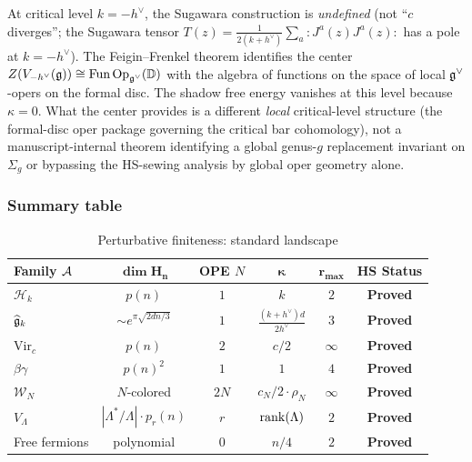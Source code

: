 \begin{remark}
\label{rem:thqg-I-ff-center}
At critical level $k = -h^\vee$, the Sugawara construction is \emph{undefined} (not ``$c$ diverges''; the Sugawara tensor $T(z) = \frac{1}{2(k+h^\vee)} \sum_a :J^a(z) J^a(z):$ has a pole at $k = -h^\vee$). The Feigin--Frenkel theorem identifies the center $Z(V_{-h^\vee}(\mathfrak{g})) \cong \mathrm{Fun}\,\mathrm{Op}_{\mathfrak{g}^\vee}(\mathbb{D})$ with the algebra of functions on the space of local $\mathfrak{g}^\vee$-opers on the formal disc. The shadow free energy vanishes at this level because $\kappa = 0$. What the center provides is a different \emph{local} critical-level structure (the formal-disc oper package governing the critical bar cohomology), not a manuscript-internal theorem identifying a global genus-$g$ replacement invariant on $\Sigma_g$ or bypassing the HS-sewing analysis by global oper geometry alone.
\end{remark}

\subsubsection{Summary table}

\begin{table}[ht]
\centering
\caption{Perturbative finiteness: standard landscape}
\label{tab:thqg-I-finiteness-summary}
\renewcommand{\arraystretch}{1.4}
{\footnotesize
\begin{tabular}{|l|c|c|c|c|c|}
\hline
\textbf{Family $\mathcal{A}$} & $\boldsymbol{\dim H_n}$ & \textbf{OPE $N$} & $\boldsymbol{\kappa}$ & $\boldsymbol{r_{\max}}$ & \textbf{HS Status} \\
\hline
$\mathcal{H}_k$ & $p(n)$ & $1$ & $k$ & $2$ & \textbf{Proved} \\
\hline
$\widehat{\mathfrak{g}}_k$ & $\sim e^{\pi\sqrt{2dn/3}}$ & $1$ & $\frac{(k+h^\vee)d}{2h^\vee}$ & $3$ & \textbf{Proved} \\
\hline
$\mathrm{Vir}_c$ & $p(n)$ & $2$ & $c/2$ & $\infty$ & \textbf{Proved} \\
\hline
$\beta\gamma$ & $p(n)^2$ & $1$ & $1$ & $4$ & \textbf{Proved} \\
\hline
$\mathcal{W}_N$ & $N$-colored & $2N$ & $c_N/2 \cdot \rho_N$ & $\infty$ & \textbf{Proved} \\
\hline
$V_\Lambda$ & $|\Lambda^*/\Lambda|\cdot p_r(n)$ & $r$ & $\operatorname{rank}(\Lambda)$ & $2$ & \textbf{Proved} \\
\hline
Free fermions & polynomial & $0$ & $n/4$ & $2$ & \textbf{Proved} \\
\hline
\end{tabular}}
\end{table}

